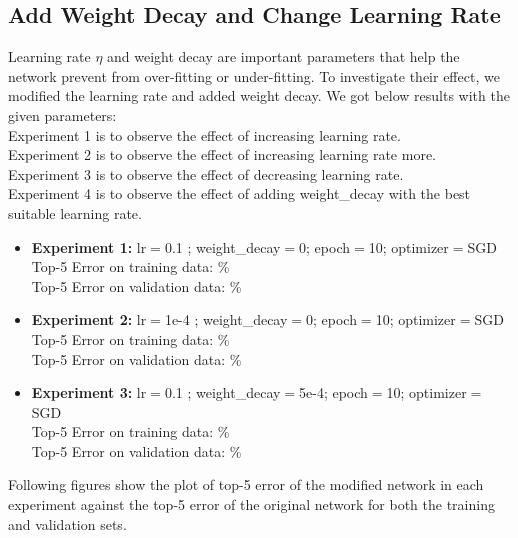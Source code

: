 \documentclass{article}
\begin{document}
\subsection{Add Weight Decay and Change Learning Rate}
Learning rate $\eta$ and weight decay are important parameters that help the network prevent from over-fitting or under-fitting. To investigate their effect, we modified the learning rate and added weight decay. We got below results with the given parameters:\\
Experiment 1 is to observe the effect of increasing learning rate. \\
Experiment 2 is to observe the effect of increasing learning rate more. \\
Experiment 3 is to observe the effect of decreasing learning rate. \\
Experiment 4 is to observe the effect of adding weight\_decay with the best suitable learning rate. \\
\begin{itemize}
    \item \textbf{Experiment 1:} lr$=$0.1 ; weight\_decay$=$0; epoch$=$10; optimizer$=$SGD \\
    Top-5 Error on training data: \% \\
    Top-5 Error on validation data:  \% \\
    \item \textbf{Experiment 2:} lr$=$1e-4 ; weight\_decay$=$0; epoch$=$10; optimizer$=$SGD \\
    Top-5 Error on training data: \% \\
    Top-5 Error on validation data:  \% \\
    \item \textbf{Experiment 3:} lr$=$0.1 ; weight\_decay$=$5e-4; epoch$=$10; optimizer$=$SGD \\
    Top-5 Error on training data: \% \\
    Top-5 Error on validation data:  \% \\
\end{itemize}

Following figures show the plot of top-5 error of the modified network in each experiment against the top-5 error of the original network for both the training and validation sets. \\
\end{document}
